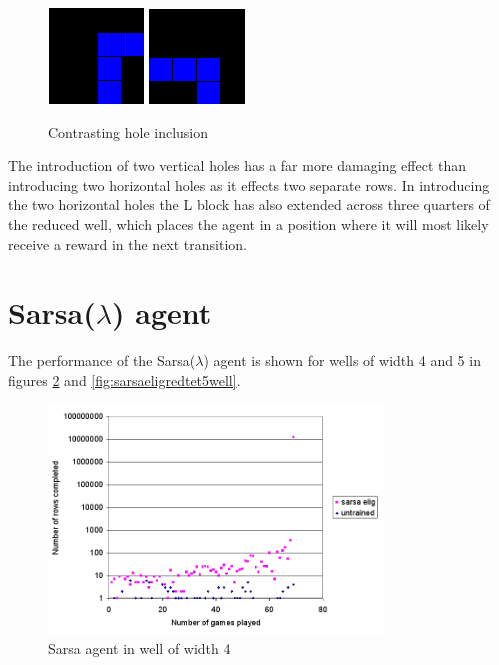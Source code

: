 \documentclass{rucsthesis}
\begin{document}
\begin{figure}[h]
\centering
\includegraphics[width=1in]{worthless.png}
\includegraphics[width=1in]{notworthless.png}
\caption{Contrasting hole inclusion}
\label{fig:diffholes}
\end{figure}

The introduction of two vertical holes has a far more damaging effect than introducing two horizontal holes as it effects two separate rows. In introducing the two horizontal holes the L block has also extended across three quarters of the reduced well, which places the agent in a position where it will most likely receive a reward in the next transition.

\section{Sarsa($\lambda$) agent}

The performance of the Sarsa($\lambda$) agent is shown for wells of width 4 and 5 in figures \ref{fig:sarsaeligredtet4well} and \ref{fig:sarsaeligredtet5well}.

\begin{figure}[h]
\centering
\includegraphics[width=3.5in]{sarsaeligredtet4well.png}
\caption{Sarsa agent in well of width 4}
\label{fig:sarsaeligredtet4well}
\end{figure}
\end{document}
